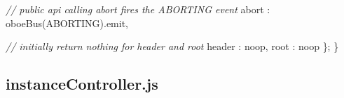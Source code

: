 \documentclass[12pt, ]{article}
\newenvironment{Shaded}{}{}
\newcommand{\DataTypeTok}[1]{\textcolor[rgb]{0.56,0.13,0.00}{{#1}}}
\newcommand{\CommentTok}[1]{\textcolor[rgb]{0.38,0.63,0.69}{\textit{{#1}}}}
\newcommand{\FunctionTok}[1]{\textcolor[rgb]{0.02,0.16,0.49}{{#1}}}
\newcommand{\NormalTok}[1]{{#1}}
\begin{document}
\begin{Shaded}
\begin{Highlighting}[]
      \CommentTok{// public api calling abort fires the ABORTING event}
      \DataTypeTok{abort          }\NormalTok{: }\FunctionTok{oboeBus}\NormalTok{(ABORTING).}\FunctionTok{emit}\NormalTok{,}
      
      \CommentTok{// initially return nothing for header and root}
      \DataTypeTok{header         }\NormalTok{: noop,}
      \DataTypeTok{root           }\NormalTok{: noop}
   \NormalTok{\};   }
\NormalTok{\}}
    
\end{Highlighting}
\end{Shaded}

\pagebreak

\subsection{instanceController.js}\label{headerux5finstanceController}

\label{src_instanceController}
\end{document}
